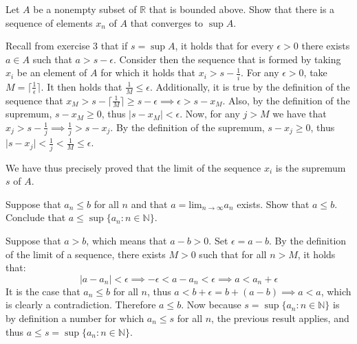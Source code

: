 \begin{exercise}{4}
    Let $A$ be a nonempty subset of $\mathbb{R}$ that is bounded above. Show that there is a sequence of elements $x_n$ of $A$ that converges to $\sup A$.
\end{exercise}

\begin{solution}

    Recall from exercise 3 that if $s = \sup A$, it holds that for every $\epsilon > 0$ there exists $a \in A$ such that $a > s - \epsilon$. Consider then the sequence that is formed by taking $x_i$ be an element of $A$ for which it holds that $x_i > s - \frac{1}{i}$. For any $\epsilon > 0$, take $M = \lceil\frac{1}{\epsilon}\rceil$. It then holds that $\frac{1}{M} \leq \epsilon$. Additionally, it is true by the definition of the sequence that $x_M > s - \lceil \frac{1}{M} \rceil \geq s -\epsilon \implies \epsilon > s - x_M$. Also, by the definition of the supremum, $s - x_M \geq 0$, thus $\lvert s - x_M \rvert < \epsilon$. Now, for any $j > M$ we have that $x_j > s - \frac{1}{j} \implies  \frac{1}{j} > s - x_j$. By the definition of the supremum, $s - x_j \geq 0$, thus $\lvert s - x_j \rvert < \frac{1}{j} < \frac{1}{M} \leq \epsilon$.

    We have thus precisely proved that the limit of the sequence $x_i$ is the supremum $s$ of $A$.
\end{solution}

\begin{exercise}{5}
    Suppose that $a_n \leq b$ for all $n$ and that $a = \text{lim}_{n\rightarrow \infty}a_n$ exists. Show that $a \leq b$. Conclude that $a \leq \sup\{a_n : n \in \mathbb{N}\}$.
\end{exercise}

\begin{solution}

    Suppose that $a > b$, which means that $a - b > 0$. Set $\epsilon = a -b$. By the definition of the limit of a sequence, there exists $M > 0$ such that for all $n > M$, it holds that:
    $$\lvert a - a_n \rvert < \epsilon \implies -\epsilon < a - a_n < \epsilon \implies a < a_n + \epsilon$$
    It is the case that $a_n \leq b$ for all $n$, thus $a < b + \epsilon = b + (a -b) \implies a < a$, which is clearly a contradiction. Therefore $a \leq b$. Now because $s = \sup\{a_n : n \in \mathbb{N}\}$ is by definition a number for which $a_n \leq s$ for all $n$, the previous result applies, and thus $a \leq s = \sup\{a_n : n \in \mathbb{N}\}$.
\end{solution}


